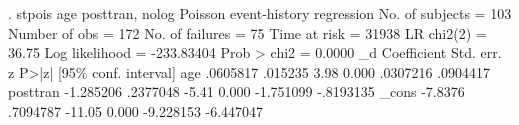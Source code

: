 . stpois age posttran, nolog
{\smallskip}
Poisson event-history regression
{\smallskip}
No. of subjects =          103                  Number of obs   =      172
No. of failures =           75
Time at risk    =        31938                  LR chi2(2)      =    36.75
Log likelihood  =   -233.83404                  Prob > chi2     =   0.0000
{\smallskip}
          _d {\VBAR} Coefficient  Std. err.      z    P>|z|     [95\% conf. interval]
         age {\VBAR}   .0605817    .015235     3.98   0.000     .0307216    .0904417
    posttran {\VBAR}  -1.285206   .2377048    -5.41   0.000    -1.751099   -.8193135
       _cons {\VBAR}    -7.8376   .7094787   -11.05   0.000    -9.228153   -6.447047
